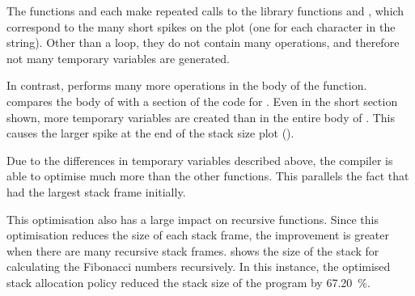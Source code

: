 \documentclass[00-main.tex]{subfiles}
\begin{document}
The functions  and  each make repeated calls to the library functions  and , which correspond to the many short spikes on the plot (one for each character in the string).
Other than a  loop, they do not contain many operations, and therefore not many temporary variables are generated.

In contrast,  performs many more operations in the body of the function.
 compares the body of  with a section of the code for .
Even in the short section shown, more temporary variables are created than in the entire body of .
This causes the larger spike at the end of the stack size plot ().





Due to the differences in temporary variables described above, the compiler is able to optimise  much more than the other functions.
This parallels the fact that  had the largest stack frame initially.


This optimisation also has a large impact on recursive functions.
Since this optimisation reduces the size of each stack frame, the improvement is greater when there are many recursive stack frames.
 shows the size of the stack for calculating the Fibonacci numbers recursively.
In this instance, the optimised stack allocation policy reduced the stack size of the program by \SI{67.20}{\percent}.
\end{document}
